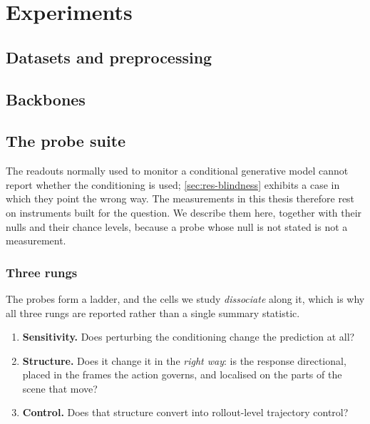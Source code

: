 \chapter{Experiments}
\label{ch:experiments}

\section{Datasets and preprocessing}
\label{sec:datasets}

\section{Backbones}
\label{sec:backbones}

\section{The probe suite}
\label{sec:probes}

The readouts normally used to monitor a conditional generative model cannot
report whether the conditioning is used; \cref{sec:res-blindness} exhibits a
case in which they point the wrong way. The measurements in this thesis
therefore rest on instruments built for the question. We describe them here,
together with their nulls and their chance levels, because a probe whose
null is not stated is not a measurement.

\subsection{Three rungs}

The probes form a ladder, and the cells we study \emph{dissociate} along it,
which is why all three rungs are reported rather than a single summary
statistic.

\begin{enumerate}
  \item \textbf{Sensitivity.} Does perturbing the conditioning change the
    prediction at all?
  \item \textbf{Structure.} Does it change it in the \emph{right way}:
    is the response directional, placed in the frames the action governs,
    and localised on the parts of the scene that move?
  \item \textbf{Control.} Does that structure convert into rollout-level
    trajectory control?
\end{enumerate}

